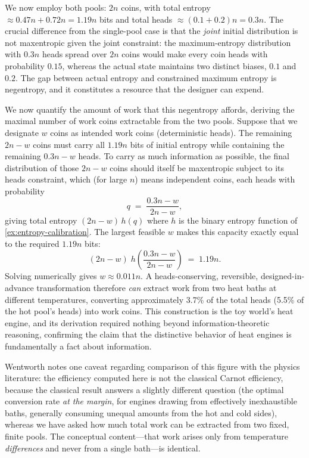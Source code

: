 \documentclass[11pt]{article}
\begin{document}
We now employ both pools: $2n$ coins, with total entropy $\approx 0.47n + 0.72n = 1.19n$ bits and total heads $\approx (0.1 + 0.2)n = 0.3n$. The crucial difference from the single-pool case is that the \emph{joint} initial distribution is not maxentropic given the joint constraint: the maximum-entropy distribution with $0.3n$ heads spread over $2n$ coins would make every coin heads with probability $0.15$, whereas the actual state maintains two distinct biases, $0.1$ and $0.2$. The gap between actual entropy and constrained maximum entropy is negentropy, and it constitutes a resource that the designer can expend.

We now quantify the amount of work that this negentropy affords, deriving the maximal number of work coins extractable from the two pools. Suppose that we designate $w$ coins as intended work coins (deterministic heads). The remaining $2n - w$ coins must carry all $1.19n$ bits of initial entropy while containing the remaining $0.3n - w$ heads. To carry as much information as possible, the final distribution of those $2n-w$ coins should itself be maxentropic subject to its heads constraint, which (for large $n$) means independent coins, each heads with probability
\[
q \;=\; \frac{0.3n - w}{2n - w},
\]
giving total entropy $(2n - w)\, h(q)$ where $h$ is the binary entropy function of \cref{ex:entropy-calibration}. The largest feasible $w$ makes this capacity exactly equal to the required $1.19n$ bits:
\[
(2n - w)\; h\!\left(\frac{0.3n - w}{2n - w}\right) \;=\; 1.19n .
\]
Solving numerically gives $w \approx 0.011n$. A heads-conserving, reversible, designed-in-advance transformation therefore \emph{can} extract work from two heat baths at different temperatures, converting approximately 3.7\% of the total heads (5.5\% of the hot pool's heads) into work coins. This construction is the toy world's heat engine, and its derivation required nothing beyond information-theoretic reasoning, confirming the claim that the distinctive behavior of heat engines is fundamentally a fact about information.

Wentworth notes one caveat regarding comparison of this figure with the physics literature: the efficiency computed here is not the classical Carnot efficiency, because the classical result answers a slightly different question (the optimal conversion rate \emph{at the margin}, for engines drawing from effectively inexhaustible baths, generally consuming unequal amounts from the hot and cold sides), whereas we have asked how much total work can be extracted from two fixed, finite pools. The conceptual content---that work arises only from temperature \emph{differences} and never from a single bath---is identical.
\end{document}

